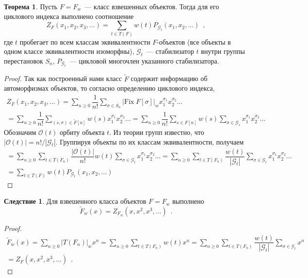 \documentclass[a5paper]{article}
\theoremstyle{definition}
\newtheorem{corollary}{Следствие}
\newtheorem*{theorem}{Теорема}
\begin{document}
\begin{theorem}
    Пусть \( F = F_w \)~--- класс взвешенных объектов. Тогда для его циклового
индекса выполнено соотношение
\[
    Z_{F}(x_1, x_2, x_3, \ldots) = \sum_{t \in T(F)} w(t) P_{\mathcal G_t} (x_1,
x_2, \ldots) \enspace ,
\]
где \( t \) пробегает по всем классам эквивалентности \( F\)-объектов (все
объекты в одном классе эквивалентности изоморфны), \( \mathcal G_t\)~--- стабилизатор \( t \)
внутри группы перестановок \( S_n \), \(P_{\mathcal G_t} \)~--- цикловой
многочлен указанного стабилизатора.
\end{theorem}
\begin{proof}
Так как построенный нами класс \( \widetilde F \) содержит информацию об
автоморфизмах объектов, то согласно определению циклового индекса,
\begin{multline*}
    Z_F(x_1, x_2, x_3, \ldots)  = \sum_{n \geq 0} \dfrac{1}{n!} \sum_{\sigma \in
S_n} |\mathrm{Fix}\; F[\sigma]|_w x_1^{\sigma_1} x_2^{\sigma_2} \ldots \\
 = \sum_{n \geq 0} \dfrac{1}{n!} \sum_{(s, \sigma) \in \widetilde F[n] }
w(s) x_1^{\sigma_1} x_2^{\sigma_2} \ldots
= \sum_{n \geq 0} \dfrac{1}{n!} \sum_{s \in F[n] } w(s) \sum_{\sigma \in
\mathcal G_s} x_1^{\sigma_1} x_2^{\sigma_2} \ldots
\end{multline*}
Обозначим \( \mathcal O(t) \) орбиту объекта \( t \). Из теории групп известно,
что \( |\mathcal O(t) | = n! / |\mathcal G_t| \).
Группируя объекты по их классам эквивалентности, получаем 
\begin{multline*}
    = \sum_{n \geq 0} \sum_{t \in T(F_n)} \dfrac{| \mathcal O(t)|}{n!} w(t)
    \sum_{\sigma \in \mathcal G_t} x_1^{\sigma_1} x_2^{\sigma_2} \ldots =
    \sum_{n \geq 0} \sum_{t \in T(F_n)} \dfrac{w(t)}{|\mathcal G_t|}
\sum_{\sigma \in \mathcal G_t} x_1^{\sigma_1} x_2^{\sigma_2} \ldots\\
= \sum_{t \in T(F)} w(t) P_{\mathcal G_t} (x_1, x_2, \ldots)
\enspace 
\end{multline*}
\end{proof}

\begin{corollary}
    Для взвешенного класса объектов \( F = F_w\) выполнено
\[
    \widetilde F_w(x) = Z_{F_w} (x, x^2, x^3, \ldots) \enspace .
\]
\end{corollary}
\begin{proof}
\begin{multline*}
    \widetilde F_w(x) = \sum_{n \geq 0} |T(F_n)|_w x^n = 
    \sum_{n \geq 0} \sum_{t \in T(F_n)} w(t) x^n = 
    \sum_{n \geq 0} \sum_{t \in T(F_n)} \dfrac{w(t)}{| \mathcal G_t|}
\sum_{\sigma \in \mathcal G_t} x^n
\\= Z_F(x, x^2, x^3, \ldots)\enspace .
\end{multline*}
\end{proof}
\end{document}
